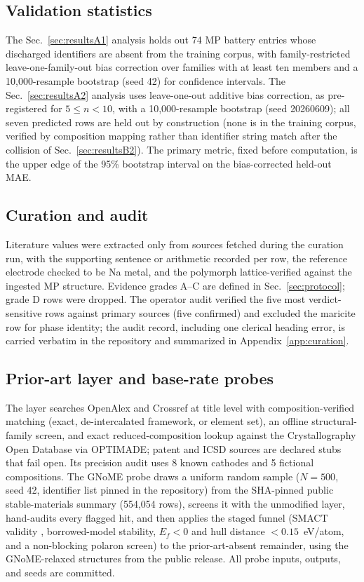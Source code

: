 \documentclass[reprint,aps,prb,amsmath,amssymb,nofootinbib,longbibliography]{revtex4-2}
\begin{document}
\subsection{Validation statistics}
The Sec.~\ref{sec:resultsA1} analysis holds out 74 MP battery entries whose
discharged identifiers are absent from the training corpus, with
family-restricted leave-one-family-out bias correction over families with at
least ten members and a 10{,}000-resample bootstrap \cite{efron1979}
(seed 42) for confidence intervals. The Sec.~\ref{sec:resultsA2} analysis uses leave-one-out additive
bias correction, as pre-registered for $5\le n<10$, with a 10{,}000-resample
bootstrap (seed 20260609); all seven predicted rows are held out by
construction (none is in the training corpus, verified by composition
mapping rather than identifier string match after the collision of
Sec.~\ref{sec:resultsB2}). The primary metric, fixed before computation, is
the upper edge of the 95\% bootstrap interval on the bias-corrected held-out
MAE.

\subsection{Curation and audit}
Literature values were extracted only from sources fetched during the
curation run, with the supporting sentence or arithmetic recorded per row,
the reference electrode checked to be Na metal, and the polymorph
lattice-verified against the ingested MP structure. Evidence grades A--C are
defined in Sec.~\ref{sec:protocol}; grade D rows were dropped. The
operator audit verified the five most verdict-sensitive rows against primary
sources (five confirmed) and excluded the maricite row for phase identity;
the audit record, including one clerical heading error, is carried verbatim
in the repository and summarized in Appendix~\ref{app:curation}.

\subsection{Prior-art layer and base-rate probes}
The layer searches OpenAlex and Crossref at title level with
composition-verified matching (exact, de-intercalated framework, or element
set), an offline structural-family screen, and exact reduced-composition
lookup against the Crystallography Open Database via OPTIMADE; patent and
ICSD sources are declared stubs that fail open. Its precision audit uses
8 known cathodes and 5 fictional compositions. The GNoME probe draws a
uniform random sample ($N=500$, seed 42, identifier list pinned in the
repository) from the SHA-pinned public stable-materials summary (554{,}054
rows), screens it with the unmodified layer, hand-audits every flagged hit,
and then applies the staged funnel (SMACT validity \cite{davies2019},
borrowed-model stability, $E_f<0$ and hull distance
$<0.15$~eV/atom, and a non-blocking polaron screen) to the
prior-art-absent remainder, using the GNoME-relaxed structures from the
public release. All probe inputs, outputs, and seeds are committed.
\end{document}
